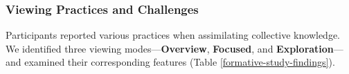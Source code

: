 \subsubsection{Viewing Practices and Challenges}

Participants reported various practices when assimilating collective knowledge. We identified three viewing modes—\textbf{Overview}, \textbf{Focused}, and \textbf{Exploration}—and examined their corresponding features (Table \ref{formative-study-findings}).




